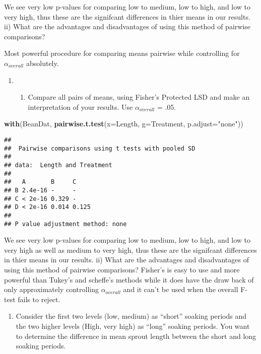 \documentclass[]{article}
\newenvironment{Shaded}{\begin{snugshade}}{\end{snugshade}}
\newcommand{\KeywordTok}[1]{\textcolor[rgb]{0.13,0.29,0.53}{\textbf{#1}}}
\newcommand{\DataTypeTok}[1]{\textcolor[rgb]{0.13,0.29,0.53}{#1}}
\newcommand{\StringTok}[1]{\textcolor[rgb]{0.31,0.60,0.02}{#1}}
\newcommand{\NormalTok}[1]{#1}
\providecommand{\tightlist}{%
  \setlength{\itemsep}{0pt}\setlength{\parskip}{0pt}}
\begin{document}
We see very low p-values for comparing low to medium, low to high, and
low to very high, thus these are the signifcant differences in thier
means in our results. ii) What are the advantages and disadvantages of
using this method of pairwise comparisons?

Most powerful procedure for comparing means pairwise while controlling
for \(\alpha_{overall}\) absolutely.

\begin{enumerate}
\def\labelenumi{\Alph{enumi})}
\setcounter{enumi}{5}
\item
  \begin{enumerate}
  \def\labelenumii{\roman{enumii})}
  \tightlist
  \item
    Compare all pairs of means, using Fisher's Protected LSD and make an
    interpretation of your results. Use \(\alpha_{overall}\) = .05.
  \end{enumerate}
\end{enumerate}

\begin{Shaded}
\begin{Highlighting}[]
\KeywordTok{with}\NormalTok{(BeanDat, }\KeywordTok{pairwise.t.test}\NormalTok{(}\DataTypeTok{x=}\NormalTok{Length, }\DataTypeTok{g=}\NormalTok{Treatment, }\DataTypeTok{p.adjust=}\StringTok{"none"}\NormalTok{))}
\end{Highlighting}
\end{Shaded}

\begin{verbatim}
## 
##  Pairwise comparisons using t tests with pooled SD 
## 
## data:  Length and Treatment 
## 
##   A       B     C    
## B 2.4e-16 -     -    
## C < 2e-16 0.329 -    
## D < 2e-16 0.014 0.125
## 
## P value adjustment method: none
\end{verbatim}

We see very low p-values for comparing low to medium, low to high, and
low to very high as well as medium to very high, thus these are the
signifcant differences in thier means in our results. ii) What are the
advantages and disadvantages of using this method of pairwise
comparisons? Fisher's is easy to use and more powerful than Tukey's and
scheffe's methods while it does have the draw back of only approximately
controlling \(\alpha_{overall}\) and it can't be used when the overall
F-test fails to reject.

\begin{enumerate}
\def\labelenumi{\Alph{enumi})}
\setcounter{enumi}{6}
\tightlist
\item
  Consider the first two levels (low, medium) as ``short'' soaking
  periods and the two higher levels (High, very high) as ``long''
  soaking periods. You want to determine the difference in mean sprout
  length between the short and long soaking periods.
\end{enumerate}
\end{document}
